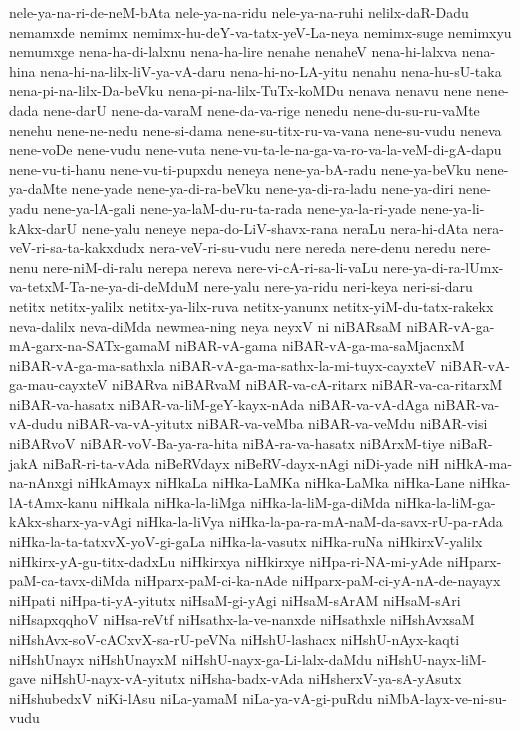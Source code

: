 {nele-ya-na-ri-de-neM-bAta
nele-ya-na-ridu
nele-ya-na-ruhi
nelilx-daR-Dadu
nemamxde
nemimx
nemimx-hu-deY-va-tatx-yeV-La-neya
nemimx-suge
nemimxyu
nemumxge
nena-ha-di-lalxnu
nena-ha-lire
nenahe
nenaheV
nena-hi-lalxva
nena-hina
nena-hi-na-lilx-liV-ya-vA-daru
nena-hi-no-LA-yitu
nenahu
nena-hu-sU-taka
nena-pi-na-lilx-Da-beVku
nena-pi-na-lilx-TuTx-koMDu
nenava
nenavu
nene
nene-dada
nene-darU
nene-da-varaM
nene-da-va-rige
nenedu
nene-du-su-ru-vaMte
nenehu
nene-ne-nedu
nene-si-dama
nene-su-titx-ru-va-vana
nene-su-vudu
neneva
nene-voDe
nene-vudu
nene-vuta
nene-vu-ta-le-na-ga-va-ro-va-la-veM-di-gA-dapu
nene-vu-ti-hanu
nene-vu-ti-pupxdu
neneya
nene-ya-bA-radu
nene-ya-beVku
nene-ya-daMte
nene-yade
nene-ya-di-ra-beVku
nene-ya-di-ra-ladu
nene-ya-diri
nene-yadu
nene-ya-lA-gali
nene-ya-laM-du-ru-ta-rada
nene-ya-la-ri-yade
nene-ya-li-kAkx-darU
nene-yalu
neneye
nepa-do-LiV-shavx-rana
neraLu
nera-hi-dAta
nera-veV-ri-sa-ta-kakxdudx
nera-veV-ri-su-vudu
nere
nereda
nere-denu
neredu
nere-nenu
nere-niM-di-ralu
nerepa
nereva
nere-vi-cA-ri-sa-li-vaLu
nere-ya-di-ra-lUmx-va-tetxM-Ta-ne-ya-di-deMduM
nere-yalu
nere-ya-ridu
neri-keya
neri-si-daru
netitx
netitx-yalilx
netitx-ya-lilx-ruva
netitx-yanunx
netitx-yiM-du-tatx-rakekx
neva-dalilx
neva-diMda
newmea-ning
neya
neyxV
ni
niBARsaM
niBAR-vA-ga-mA-garx-na-SATx-gamaM
niBAR-vA-gama
niBAR-vA-ga-ma-saMjacnxM
niBAR-vA-ga-ma-sathxla
niBAR-vA-ga-ma-sathx-la-mi-tuyx-cayxteV
niBAR-vA-ga-mau-cayxteV
niBARva
niBARvaM
niBAR-va-cA-ritarx
niBAR-va-ca-ritarxM
niBAR-va-hasatx
niBAR-va-liM-geY-kayx-nAda
niBAR-va-vA-dAga
niBAR-va-vA-dudu
niBAR-va-vA-yitutx
niBAR-va-veMba
niBAR-va-veMdu
niBAR-visi
niBARvoV
niBAR-voV-Ba-ya-ra-hita
niBA-ra-va-hasatx
niBArxM-tiye
niBaR-jakA
niBaR-ri-ta-vAda
niBeRVdayx
niBeRV-dayx-nAgi
niDi-yade
niH
niHkA-ma-na-nAnxgi
niHkAmayx
niHkaLa
niHka-LaMKa
niHka-LaMka
niHka-Lane
niHka-lA-tAmx-kanu
niHkala
niHka-la-liMga
niHka-la-liM-ga-diMda
niHka-la-liM-ga-kAkx-sharx-ya-vAgi
niHka-la-liVya
niHka-la-pa-ra-mA-naM-da-savx-rU-pa-rAda
niHka-la-ta-tatxvX-yoV-gi-gaLa
niHka-la-vasutx
niHka-ruNa
niHkirxV-yalilx
niHkirx-yA-gu-titx-dadxLu
niHkirxya
niHkirxye
niHpa-ri-NA-mi-yAde
niHparx-paM-ca-tavx-diMda
niHparx-paM-ci-ka-nAde
niHparx-paM-ci-yA-nA-de-nayayx
niHpati
niHpa-ti-yA-yitutx
niHsaM-gi-yAgi
niHsaM-sArAM
niHsaM-sAri
niHsapxqqhoV
niHsa-reVtf
niHsathx-la-ve-nanxde
niHsathxle
niHshAvxsaM
niHshAvx-soV-cACxvX-sa-rU-peVNa
niHshU-lashacx
niHshU-nAyx-kaqti
niHshUnayx
niHshUnayxM
niHshU-nayx-ga-Li-lalx-daMdu
niHshU-nayx-liM-gave
niHshU-nayx-vA-yitutx
niHsha-badx-vAda
niHsherxV-ya-sA-yAsutx
niHshubedxV
niKi-lAsu
niLa-yamaM
niLa-ya-vA-gi-puRdu
niMbA-layx-ve-ni-su-vudu
}
